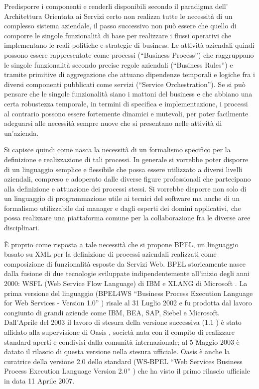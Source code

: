 Predisporre i componenti e renderli disponibili secondo il paradigma dell'
Architettura Orientata ai Servizi certo non realizza tutte le necessità di un
complesso sistema aziendale, il passo successivo non può essere che quello di
comporre le singole funzionalità di base per realizzare i flussi operativi che
implementano le reali politiche e strategie di business. Le attività aziendali
quindi possono essere rappresentate come processi (``Business Process'') che
raggruppano le singole funzionalità secondo precise regole aziendali (``Business
Rules'') e tramite primitive di aggregazione che attuano dipendenze temporali e
logiche fra i diversi componenti pubblicati come servizi (``Service
Orchestration''). Se si può pensare che le singole funzionalità siano i mattoni
del business e che abbiano una certa robustezza temporale, in termini di
specifica e implementazione, i processi al contrario possono essere fortemente
dinamici e mutevoli, per poter facilmente adeguarsi alle necessità sempre nuove
che si presentano nelle attività di un'azienda.

Si capisce quindi come nasca la necessità di un formalismo specifico per la
definizione e realizzazione di tali processi. In generale si vorrebbe poter
disporre di un linguaggio semplice e flessibile che possa essere utilizzato a
diversi livelli aziendali, compreso e adoperato dalle diverse figure
professionali che partecipano alla definizione e attuazione dei processi
stessi. Si vorrebbe disporre non solo di un linguaggio di programmazione
utile ai tecnici del software ma anche di un formalismo utilizzabile dai manager
e dagli esperti dei domini applicativi, che possa realizzare una piattaforma
comune per la collaborazione fra le diverse aree disciplinari.

\`E proprio come risposta a tale necessità che si propone BPEL, un linguaggio
basato su XML per la definizione di processi aziendali realizzati come
composizione di funzionalità esposte da Servizi Web. BPEL storicamente nasce
dalla fusione di due tecnologie sviluppate indipendentemente all'inizio degli
anni 2000: WSFL (Web Service Flow Language) di IBM \cite{WSFL} e XLANG di
Microsoft \cite{XLANG}. La prima versione del linguaggio (BPEL4WS ``Business
Process Execution Language for Web Services - Version 1.0'' \cite{BPEL10Spec})
risale al 31 Luglio 2002 e fu prodotta dal lavoro congiunto di grandi aziende
come IBM, BEA, SAP, Siebel e Microsoft. Dall'Aprile del 2003 il lavoro di stesura
della versione successiva (1.1 \cite{BPEL11Spec})  è stato affidato alla
supervisione di Oasis \cite{OASISSite}, società nata con il compito di realizzare
standard aperti e condivisi dalla comunità internazionale; al 5 Maggio 2003 è
datato il rilascio di questa versione nella stesura ufficiale. Oasis è  anche la
curatrice della versione 2.0 dello standard (WS-BPEL ``Web Services Business
Process Execution Language Version 2.0'' \cite{BPEL20Spec}) che ha visto il primo
rilascio ufficiale in data 11 Aprile 2007.
\\

